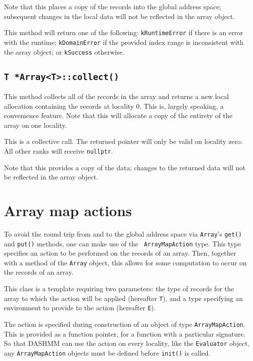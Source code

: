 Note that this places a copy of the records into the global address space;
subsequent changes in the local data will not be reflected in the array object.

This method will return one of the following: {\tt kRuntimeError} if there is an
error with the runtime; {\tt kDomainError} if the provided index range is
inconsistent with the array object; or {\tt kSuccess} otherwise.

\subsection{{\tt T *Array<T>::collect()}}

This method collects all of the records in the array and returns a new local
allocation containing the records at locality 0. This is, largely speaking, a
convenience feature. Note that this will allocate a copy of the entirety of the
array on one locality.

This is a collective call. The returned pointer will only be valid on locality
zero. All other ranks will receive {\tt nullptr}.

Note that this provides a copy of the data; changes to the returned data will
not be reflected in the array object.

\section{Array map actions}

To avoid the round trip from and to the global address space via {\tt Array}'s
{\tt get()} and {\tt put()} methods, one can make use of the {\tt
  ArrayMapAction}  type.
This type specifies an action to be performed on the records of an array.
Then, together with a method of the {\tt Array} object, this allows for
some computation to occur on the records of an array.

This class is a template requiring two parameters: the type of records for
the array to which the action will be applied (hereafter {\tt T}), and a type
specifying an environment to provide to the action (hereafter {\tt E}).

The action is specified during construction of an object of type
{\tt ArrayMapAction}. This is provided as a function pointer, for a function
with a particular signature. So that DASHMM can use the action on every
locality, like the {\tt Evaluator} object, any {\tt ArrayMapAction} objects must
be defined before {\tt init()} is called.

